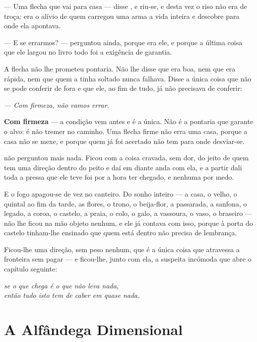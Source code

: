 \documentclass[livro.tex]{subfiles}
\begin{document}
\medskip
\noindent --- Uma flecha que vai para casa --- disse \Ben , e riu-se, e desta
vez o riso não era de troça: era o alívio de quem carregou uma arma a vida
inteira e descobre para onde ela apontava.

\medskip
\noindent --- E se errarmos? --- perguntou ainda, porque era ele, e porque a
última coisa que ele largou no livro todo foi a exigência de garantia.

\medskip
\noindent A flecha não lhe prometeu pontaria. Não lhe disse que era boa, nem que
era rápida, nem que quem a tinha soltado nunca falhava. Disse a única coisa que
não se pode conferir de fora e que ele, ao fim de tudo, já não precisava de
conferir:

\begin{center}
\emph{--- Com firmeza, não vamos errar.}
\end{center}

\medskip
\noindent \textbf{Com firmeza} --- a condição vem antes e é a única. Não é a
pontaria que garante o alvo: é não tremer no caminho. Uma flecha firme não erra
uma casa, porque a casa não se mexe, e porque quem já foi acertado não tem para
onde desviar-se.

\medskip
\noindent \Ben não perguntou mais nada. Ficou com a coisa cravada, sem dor, do
jeito de quem tem uma direção dentro do peito e daí em diante anda com ela, e a
partir dali toda a pressa que ele teve foi por a hora ter chegado, e nenhuma por
medo.

\medskip
\noindent E o fogo apagou-se de vez no canteiro. Do sonho inteiro --- a casa, o
velho, o quintal ao fim da tarde, as flores, o trono, o beija-flor, a passarada,
a sanfona, o legado, a coroa, o castelo, a praia, o colo, o galo, a vassoura, o
vaso, o braseiro --- não lhe ficou na mão objeto nenhum, e ele já contava com
isso, porque à porta do castelo tinham-lhe ensinado que quem está dentro não
precisa de lembrança.

\medskip
\noindent Ficou-lhe uma direção, sem peso nenhum, que é a única coisa que
atravessa a fronteira sem pagar --- e ficou-lhe, junto com ela, a suspeita
incómoda que abre o capítulo seguinte:

\begin{center}
\emph{se o que chega é o que não leva nada,\\
então tudo isto tem de caber em quase nada.}
\end{center}

\part{A Alfândega Dimensional}
\end{document}
